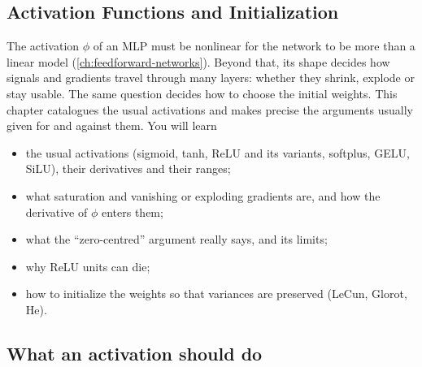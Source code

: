 \begin{notechapter}
\chapter{Activation Functions and Initialization}\label{ch:activation-functions}

\begin{chapterintro}
The activation $\phi$ of an MLP must be nonlinear for the network to be more than a linear
model (\cref{ch:feedforward-networks}). Beyond that, its shape decides how signals and
gradients travel through many layers: whether they shrink, explode or stay usable. The
same question decides how to choose the initial weights. This chapter catalogues the usual
activations and makes precise the arguments usually given for and against them. You will
learn
\begin{itemize}[nosep]
  \item the usual activations (sigmoid, tanh, ReLU and its variants, softplus, GELU, SiLU),
        their derivatives and their ranges;
  \item what saturation and vanishing or exploding gradients are, and how the derivative of
        $\phi$ enters them;
  \item what the ``zero-centred'' argument really says, and its limits;
  \item why ReLU units can die;
  \item how to initialize the weights so that variances are preserved (LeCun, Glorot, He).
\end{itemize}
\end{chapterintro}

\section{What an activation should do}\label{activation-functions:sec:properties}


\end{notechapter}
